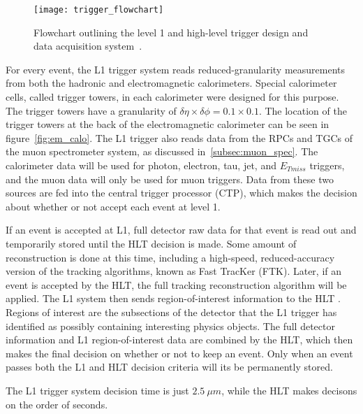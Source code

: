 \begin{figure}[!ht]\centering
\texttt{[image: trigger\_flowchart]}
\caption{Flowchart outlining the level 1 and high-level trigger design and data acquisition system~\cite{atlas-trigger}.}
\label{fig:trigger_flowchart}
\end{figure}

For every event, the L1 trigger system reads reduced-granularity measurements from both the hadronic and electromagnetic calorimeters.
Special calorimeter cells, called trigger towers, in each calorimeter were designed for this purpose.
The trigger towers have a granularity of $\delta \eta \times \delta \phi = 0.1 \times 0.1$.
The location of the trigger towers at the back of the electromagnetic calorimeter can be seen in figure~\ref{fig:em_calo}.
The L1 trigger also reads data from the RPCs and TGCs of the muon spectrometer system, as discussed in~\ref{subsec:muon_spec}.
The calorimeter data will be used for photon, electron, tau, jet, and $E_{Tmiss}$ triggers, and the muon data will only be used for muon triggers.
Data from these two sources are fed into the central trigger processor (CTP),
which makes the decision about whether or not accept each event at level 1.

If an event is accepted at L1, full detector raw data for that event is read out and temporarily stored until the HLT decision is made.
Some amount of reconstruction is done at this time, including a high-speed,
reduced-accuracy version of the tracking algorithms, known as Fast TracKer (FTK).
Later, if an event is accepted by the HLT, the full tracking reconstruction algorithm will be applied.
The L1 system then sends region-of-interest information to the HLT .
Regions of interest are the subsections of the detector that the L1 trigger has identified as possibly containing interesting physics objects.
The full detector information and L1 region-of-interest data are combined by the HLT,
which then makes the final decision on whether or not to keep an event.
Only when an event passes both the L1 and HLT decision criteria will its be permanently stored.

The L1 trigger system decision time is just $2.5~\mu m$, while the HLT makes decisons on the order of seconds.